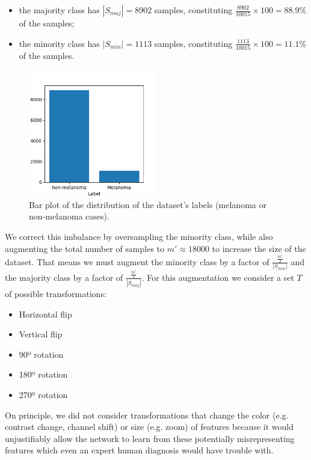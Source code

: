 \begin{itemize}
    \item the majority class has $|S_{maj}| = 8902$ samples, constituting $\frac{8902}{10015} \times 100 = 88.9\%$ of the samples;
    \item the minority class has $|S_{min}| = 1113$ samples, constituting $\frac{1113}{10015} \times 100 = 11.1\%$ of the samples.
\end{itemize}

\begin{figure}[ht]
    \centering
    \includegraphics[width=0.5\textwidth]{figs/data_barplot.png}
    \caption{Bar plot of the distribution of the dataset's labels (melanoma or non-melanoma cases).}
    \label{fig:classimbalance}
\end{figure}

We correct this imbalance by oversampling the minority class, while also augmenting the total number of samples to $m' \approx 18000$ to increase the size of the dataset. That means we must augment the minority class by a factor of $\frac{\frac{m'}{2}}{|S_{min}|}$ and the majority class by a factor of $\frac{\frac{m'}{2}}{|S_{maj}|}$. For this augmentation we consider a set $T$ of possible transformations:

\begin{itemize}
    \item Horizontal flip
    \item Vertical flip
    \item 90º rotation
    \item 180º rotation
    \item 270º rotation
\end{itemize}

On principle, we did not consider transformations that change the color (e.g. contrast change, channel shift) or size (e.g. zoom) of features because it would unjustifiably allow the network to learn from these potentially misrepresenting features which even an expert human diagnosis would have trouble with.

